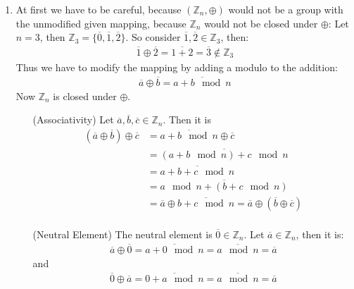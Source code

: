 \documentclass[solution]{tudexercise}
\begin{document}
			\subsubsection{}
				\begin{enumerate}
				\item
				At first we have to be careful, because $(\mathbb{Z}_n, \oplus)$ would not be a group with the unmodified given mapping, because $\mathbb{Z}_n$ would not be closed under $\oplus$: Let $n = 3$, then $\mathbb{Z}_3 = \{\overline{0}, \overline{1}, \overline{2}\}$. So consider $\overline{1}, \overline{2} \in \mathbb{Z}_3$, then:
				\begin{align*}
\overline{1} \oplus \overline{2} = \overline{1 + 2} = \overline{3} \notin \mathbb{Z}_3
				\end{align*}
				Thus we have to modify the mapping by adding a modulo to the addition:
				\begin{align}
\overline{a} \oplus \overline{b} = \overline{a + b \mod n}
				\end{align}
				Now $\mathbb{Z}_n$ is closed under $\oplus$.\\
				\begin{itemize}
				\item[(Associativity)] Let $\overline{a}, \overline{b}, \overline{c} \in \mathbb{Z}_n$. Then it is
				\begin{align*}
(\overline{a} \oplus \overline{b}) \oplus \overline{c} &= \overline{a + b \mod n} \oplus \overline{c}\\
&= \overline{(a + b \mod n) + c \mod n}\\
&= \overline{a + b + c \mod n}\\
&= \overline{a \mod n + (b + c \mod n)}\\
&= \overline{a} \oplus \overline{b + c \mod n} = \overline{a} \oplus (\overline{b} \oplus \overline{c})\\
				\end{align*}
				
				\item[(Neutral Element)]
				The neutral element is $\overline{0} \in \mathbb{Z}_n$. Let $\overline{a} \in \mathbb{Z}_n$, then it is:
				\begin{align*}
\overline{a} \oplus \overline{0} = \overline{a + 0 \mod n} = \overline{a \mod n} = \overline{a}
				\end{align*}
				and
				\begin{align*}
\overline{0} \oplus \overline{a} = \overline{0 + a \mod n} = \overline{a \mod n} = \overline{a}
				\end{align*}
				

\end{itemize}
\end{enumerate}
\end{document}
